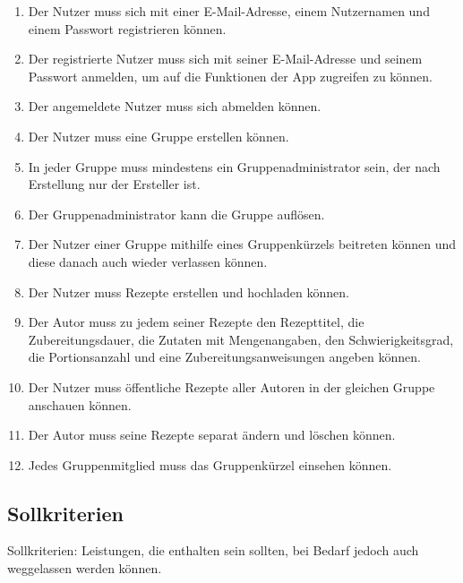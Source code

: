 \documentclass[parskip=full]{scrartcl}
\begin{document}
\begin{enumerate}[start=1,label={$\langle$\bfseries RM\arabic*$\rangle$}, leftmargin = 5em, itemsep=4pt, parsep=4pt]
    \item Der Nutzer muss sich mit einer E-Mail-Adresse, einem Nutzernamen und einem Passwort registrieren können.\label{rm:Registering}
    \item Der registrierte Nutzer muss sich mit seiner E-Mail-Adresse und seinem Passwort anmelden, um auf die Funktionen der App zugreifen zu können. \label{rm:Login}
    \item Der angemeldete Nutzer muss sich abmelden können. \label{rm:Logout}
    \item Der Nutzer muss eine Gruppe erstellen können. \label{rm:GroupCreation}
    \item In jeder Gruppe muss mindestens ein Gruppenadministrator sein, der nach Erstellung nur der Ersteller ist.\label{rm:GroupAdmin}
    \item Der Gruppenadministrator kann die Gruppe auflösen. \label{rm:GroupDeletion}
    \item Der Nutzer einer Gruppe mithilfe eines Gruppenkürzels beitreten können und diese danach auch wieder verlassen können.\label{rm:GroupJoining}
    \item Der Nutzer muss Rezepte erstellen und hochladen können.\label{rm:RecipeCreation}
    \item Der \Gls{Autor} muss zu jedem seiner Rezepte den Rezepttitel, die Zubereitungsdauer, die Zutaten mit Mengenangaben, den Schwierigkeitsgrad, die Portionsanzahl und eine Zubereitungsanweisungen angeben können.\label{rm:RecipeContents}
    \item Der Nutzer muss öffentliche Rezepte aller Autoren in der gleichen Gruppe anschauen können.\label{rm:RecipeViewing}
    \item Der \Gls{Autor} muss seine Rezepte separat ändern und löschen können.\label{rm:RecipeManagement}
    \item Jedes Gruppenmitglied muss das Gruppenkürzel einsehen können.\label{rm:GroupId}
\end{enumerate}

\subsection{Sollkriterien}
Sollkriterien: Leistungen, die enthalten sein sollten, bei Bedarf jedoch auch weggelassen werden können.
\end{document}
